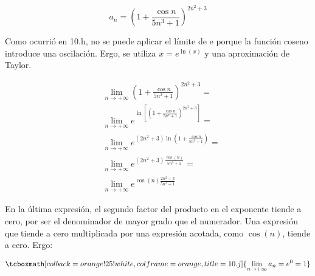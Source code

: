 \documentclass{article}
\newcommand{\hresult}[2]{\tcboxmath[colback=orange!25!white,colframe=orange, title=#1] {#2} }
\newcommand{\limninf}{\lim_{n \rightarrow +\infty}}
\begin{document}
\begin{equation}
a_n = \left( 1 + \frac{\cos n}{5n^3 + 1} \right)^{2n^2 + 3}
\end{equation}

Como ocurrió en 10.h, no se puede aplicar el límite de e porque la función coseno introduce una oscilación. Ergo, se utiliza $ x = e^{\ln(x)} $ y una aproximación de Taylor.

\begin{subequations}
\begin{align}
& \limninf \left( 1 + \frac{\cos n}{5n^3 + 1} \right)^{2n^2 + 3} = \\
& \limninf e^{ \ln \left[ \left( 1 + \frac{\cos n}{5n^3 + 1} \right)^{2n^2 + 3} \right] } = \\
& \limninf e^{ (2n^2+3) \ln\left( 1 + \frac{\cos n}{5n^3 + 1} \right) } = \\
& \limninf e^{ (2n^2+3) \frac{\cos(n)}{5n^3+1} } = \\
& \limninf e^{ \cos(n) \frac{2n^2+3}{5n^3+1} }
\end{align}
\end{subequations}

En la última expresión, el segundo factor del producto en el exponente tiende a cero, por ser el denominador de mayor grado que el numerador. Una expresión que tiende a cero multiplicada por una expresión acotada, como $ \cos(n) $, tiende a cero. Ergo:

\begin{equation}
\hresult{10.j}{ \limninf a_n = e^0 = 1 }
\end{equation}
\end{document}

